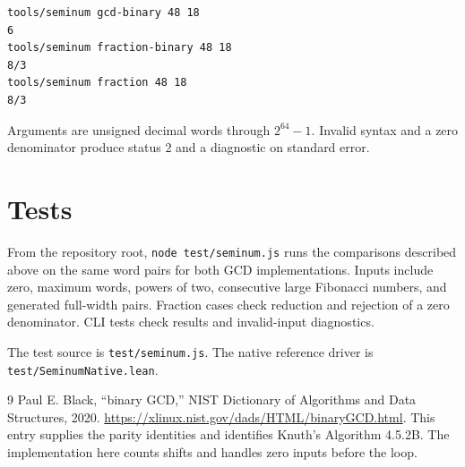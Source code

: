 \begin{lstlisting}
tools/seminum gcd-binary 48 18
6
tools/seminum fraction-binary 48 18
8/3
tools/seminum fraction 48 18
8/3
\end{lstlisting}

Arguments are unsigned decimal words through $2^{64}-1$.  Invalid syntax
and a zero denominator produce status 2 and a diagnostic on standard error.

\section{Tests}
From the repository root, \texttt{node test/seminum.js} runs the comparisons
described above on the same word pairs for both GCD implementations.
Inputs include zero, maximum words, powers of two, consecutive large Fibonacci
numbers, and generated full-width pairs.  Fraction cases check reduction and
rejection of a zero denominator.  CLI tests check results and invalid-input
diagnostics.

The test source is \texttt{test/seminum.js}.  The native reference driver is
\texttt{test/SeminumNative.lean}.

\begin{thebibliography}{9}
 Paul E. Black, ``binary GCD,'' NIST Dictionary of Algorithms
and Data Structures, 2020.
\url{https://xlinux.nist.gov/dads/HTML/binaryGCD.html}.
This entry supplies the parity identities and identifies Knuth's Algorithm
4.5.2B.  The implementation here counts shifts and handles zero inputs before
the loop.
\end{thebibliography}

